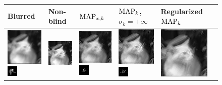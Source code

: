     \begin{figure}
    \centering
    \begin{tabular}{|l|l|l|l|l|l|}
 \hline 
Blurred & Non-blind & $\operatorname{MAP}_{x,k}$ & $\operatorname{MAP}_k$, $\sigma_k=+\infty$ & Regularized $\operatorname{MAP}_k$ \\ 
 \hline 
\includegraphics[width=2.5cm]{results/louxor_kernel1_blurred.png}
\includegraphics[width=0.5cm]{images/kernel1}
& \includegraphics[width=2.5cm]{results/louxor_kernel1_nonblind_deconv.png}
&\includegraphics[width=2.5cm]{results/louxor_kernel1_MAPxk_x.png}
\includegraphics[width=0.5cm]{results/louxor_kernel1_MAPxk_k.png}
&\includegraphics[width=2.5cm]{results/louxor_kernel1_MAPk_x.png}
\includegraphics[width=0.5cm]{results/louxor_kernel1_MAPk_k.png}
&\includegraphics[width=2.5cm]{results/louxor_kernel1_MAPkreg_x.png}

\end{tabular}
\end{figure}
